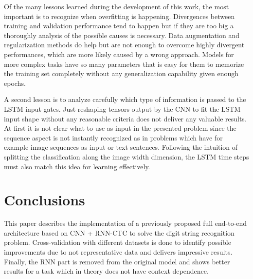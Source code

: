 Of the many lessons learned during the development of this work, the most important is to recognize when overfitting is happening. Divergences between training and validation performance tend to happen but if they are too big a thoroughly analysis of the possible causes is necessary. Data augmentation and regularization methods do help but are not enough to overcome highly divergent performances, which are more likely caused by a wrong approach. Models for more complex tasks have so many parameters that is easy for them to memorize the training set completely without any generalization capability given enough epochs. 

A second lesson is to analyze carefully which type of information is passed to the LSTM input gates. Just reshaping tensors output by the CNN to fit the LSTM input shape without any reasonable criteria does not deliver any valuable results. At first it is not clear what to use as input in the presented problem since the sequence aspect is not instantly recognized as in problems which have for example image sequences as input or text sentences. Following the intuition of splitting the classification along the image width dimension, the LSTM time steps must also match this idea for learning effectively.

\section{Conclusions}\label{sec:conclusion}

This paper describes the implementation of a previously proposed full end-to-end architecture based on CNN + RNN-CTC to solve the digit string recognition problem. Cross-validation with different datasets is done to identify possible improvements due to not representative data and delivers impressive results. Finally, the RNN part is removed from the original model and shows better results for a task which in theory does not have context dependence. 

